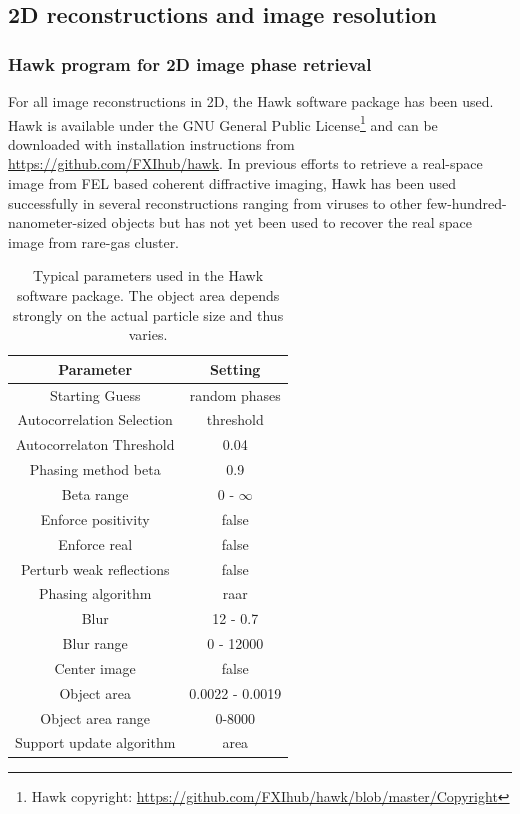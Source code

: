 \subsection{2D reconstructions and image resolution}
%
%
%
\subsubsection{Hawk program for 2D image phase retrieval}
For all image reconstructions in 2D, the Hawk software package \citep{Maia-2010-JAC} has been used. Hawk is available under the GNU General Public License\footnote{Hawk copyright: \url{https://github.com/FXIhub/hawk/blob/master/Copyright}} and can be downloaded with installation instructions from \url{https://github.com/FXIhub/hawk}. In previous efforts to retrieve a real-space image from FEL based coherent diffractive imaging, Hawk has been used successfully in several reconstructions ranging from viruses \citep{Seibert-2011-Nature,Ekeberg-2015-PRL} to other few-hundred-nanometer-sized objects \citep{Seibert-2010-JPhysB} but has not yet been used to recover the real space image from rare-gas cluster.
\begin{table}%
\centering
\begin{tabular}{ |c|c|}
 \hline
 \textbf{Parameter} & \textbf{Setting} \\ 
 \hline
 Starting Guess & random phases \\ \hline
 Autocorrelation Selection & threshold \\ \hline
 Autocorrelaton Threshold & 0.04  \\ \hline
 Phasing method beta & 0.9  \\ \hline
 Beta range & 0 - $\infty$ \\ \hline
 Enforce positivity & false   \\ \hline
 Enforce real & false     \\\hline
Perturb weak reflections & false \\ \hline
Phasing algorithm & raar \\ \hline
Blur & 12 - 0.7 \\ \hline
Blur range & 0 - 12000 \\ \hline
Center image & false \\ \hline
Object area & 0.0022 - 0.0019 \\ \hline
Object area range & 0-8000\\ \hline
Support update algorithm & area \\ \hline
\end{tabular}
\caption[Typical parameters used in the Hawk software package.]{Typical parameters used in the Hawk software package. The object area depends strongly on the actual particle size and thus varies.}
\label{tab:hawk-parameter}
\end{table}

